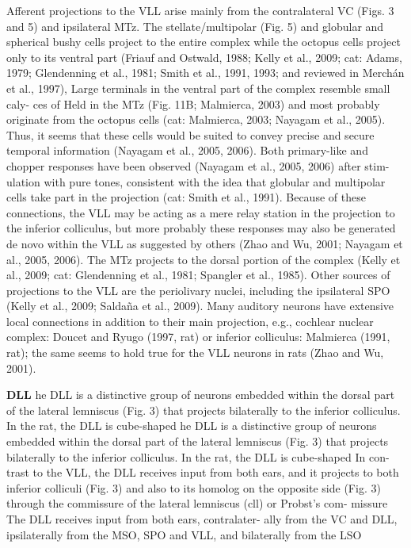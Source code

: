 \documentclass[12pt,a4paper,pdftex]{article}
\begin{document}
Afferent projections to the VLL arise mainly from
the contralateral VC (Figs. 3 and 5) and ipsilateral
MTz. The stellate/multipolar (Fig. 5) and globular and
spherical bushy cells project to the entire complex while
the octopus cells project only to its ventral part (Friauf
and Ostwald, 1988; Kelly et al., 2009; cat: Adams, 1979;
Glendenning et al., 1981; Smith et al., 1991, 1993; and
reviewed in Merchán et al., 1997), Large terminals in
the ventral part of the complex resemble small caly-
ces of Held in the MTz (Fig. 11B; Malmierca, 2003) and
most probably originate from the octopus cells (cat:
Malmierca, 2003; Nayagam et al., 2005). Thus, it seems
that these cells would be suited to convey precise and
secure temporal information (Nayagam et al., 2005,
2006). Both primary-like and chopper responses have
been observed (Nayagam et al., 2005, 2006) after stim-
ulation with pure tones, consistent with the idea that
globular and multipolar cells take part in the projection
(cat: Smith et al., 1991). Because of these connections,
the VLL may be acting as a mere relay station in the
projection to the inferior colliculus, but more probably
these responses may also be generated de novo within
the VLL as suggested by others (Zhao and Wu, 2001;
Nayagam et al., 2005, 2006). The MTz projects to the
dorsal portion of the complex (Kelly et al., 2009; cat:
Glendenning et al., 1981; Spangler et al., 1985). Other
sources of projections to the VLL are the periolivary
nuclei, including the ipsilateral SPO (Kelly et al., 2009;
Saldaña et al., 2009). Many auditory neurons have
extensive local connections in addition to their main
projection, e.g., cochlear nuclear complex: Doucet and
Ryugo (1997, rat) or inferior colliculus: Malmierca
(1991, rat); the same seems to hold true for the VLL
neurons in rats (Zhao and Wu, 2001).

\textbf{DLL}
he DLL is a distinctive group of neurons embedded
within the dorsal part of the lateral lemniscus (Fig. 3) that
projects bilaterally to the inferior colliculus. In the rat,
the DLL is cube-shaped
he DLL is a distinctive group of neurons embedded
within the dorsal part of the lateral lemniscus (Fig. 3) that
projects bilaterally to the inferior colliculus. In the rat,
the DLL is cube-shaped
In con-
trast to the VLL, the DLL receives input from both ears,
and it projects to both inferior colliculi (Fig. 3) and also
to its homolog on the opposite side (Fig. 3) through the
commissure of the lateral lemniscus (cll) or Probst’s com-
missure
The DLL receives input from both ears, contralater-
ally from the VC and DLL, ipsilaterally from the MSO,
SPO and VLL, and bilaterally from the LSO
\end{document}
